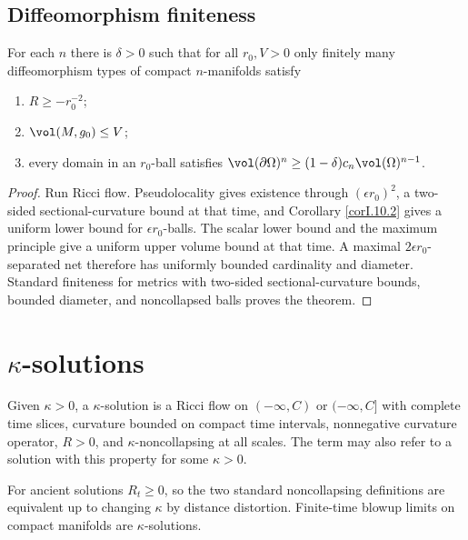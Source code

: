 \subsection{Diffeomorphism finiteness}
\label{I.10.5}
\begin{theorem}
  \label{thm:kl-diffeomorphism-finiteness-existence-riemannian-metrics}
For each $n$ there is $\delta>0$ such that for all $r_0,V>0$ only finitely many
diffeomorphism types of compact $n$-manifolds satisfy
\begin{enumerate}
\item $R\ge-r_0^{-2}$;
\item $\vol(M,g_0)\le V$;
\item every domain in an $r_0$-ball satisfies
$\vol(\partial\Omega)^n\ge(1-\delta)c_n\vol(\Omega)^{n-1}$.
\end{enumerate}
\end{theorem}
\begin{proof}
\sketch
Run Ricci flow. Pseudolocality gives existence through $(\epsilon r_0)^2$, a
two-sided sectional-curvature bound at that time, and Corollary \ref{corI.10.2}
gives a uniform lower bound for $\epsilon r_0$-balls. The scalar lower bound and
the maximum principle give a uniform upper volume bound at that time. A maximal
$2\epsilon r_0$-separated net therefore has uniformly bounded cardinality and
diameter. Standard finiteness for metrics with two-sided sectional-curvature
bounds, bounded diameter, and noncollapsed balls proves the theorem.
\end{proof}

\section{$\kappa$-solutions}
\label{secI.11.1}
\begin{definition}
\label{def:kl-solutions-kappa-noncollapsing}

Given $\kappa>0$, a $\kappa$-solution is a Ricci flow on
 $(-\infty,C)$ or $(-\infty,C]$ with complete time slices, curvature
bounded on compact time intervals, nonnegative curvature operator, $R>0$,
and $\kappa$-noncollapsing at all scales.  The term may also refer to a
solution with this property for some $\kappa>0$.
\end{definition}
For ancient solutions $R_t\geq0$, so the two standard noncollapsing
definitions are equivalent up to changing $\kappa$ by distance distortion.
Finite-time blowup limits on compact manifolds are $\kappa$-solutions.

